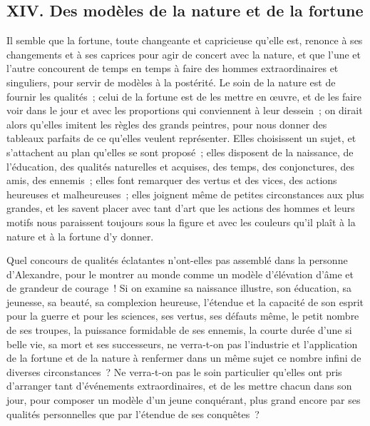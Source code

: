 \documentclass[french,twoside]{book} %
\begin{document}
\subsection[{XIV. Des modèles de la nature et de la fortune}]{XIV. Des modèles de la nature et de la fortune}
\noindent Il semble que la fortune, toute changeante et capricieuse qu’elle est, renonce à ses changements et à ses caprices pour agir de concert avec la nature, et que l’une et l’autre concourent de temps en temps à faire des hommes extraordinaires et singuliers, pour servir de modèles à la postérité. Le soin de la nature est de fournir les qualités ; celui de la fortune est de les mettre en œuvre, et de les faire voir dans le jour et avec les proportions qui conviennent à leur dessein ; on dirait alors qu’elles imitent les règles des grands peintres, pour nous donner des tableaux parfaits de ce qu’elles veulent représenter. Elles choisissent un sujet, et s’attachent au plan qu’elles se sont proposé ; elles disposent de la naissance, de l’éducation, des qualités naturelles et acquises, des temps, des conjonctures, des amis, des ennemis ; elles font remarquer des vertus et des vices, des actions heureuses et malheureuses ; elles joignent même de petites circonstances aux plus grandes, et les savent placer avec tant d’art que les actions des hommes et leurs motifs nous paraissent toujours sous la figure et avec les couleurs qu’il plaît à la nature et à la fortune d’y donner.\par
Quel concours de qualités éclatantes n’ont-elles pas assemblé dans la personne d’Alexandre, pour le montrer au monde comme un modèle d’élévation d’âme et de grandeur de courage ! Si on examine sa naissance illustre, son éducation, sa jeunesse, sa beauté, sa complexion heureuse, l’étendue et la capacité de son esprit pour la guerre et pour les sciences, ses vertus, ses défauts même, le petit nombre de ses troupes, la puissance formidable de ses ennemis, la courte durée d’une si belle vie, sa mort et ses successeurs, ne verra-t-on pas l’industrie et l’application de la fortune et de la nature à renfermer dans un même sujet ce nombre infini de diverses circonstances ? Ne verra-t-on pas le soin particulier qu’elles ont pris d’arranger tant d’événements extraordinaires, et de les mettre chacun dans son jour, pour composer un modèle d’un jeune conquérant, plus grand encore par ses qualités personnelles que par l’étendue de ses conquêtes ?\par
\end{document}
